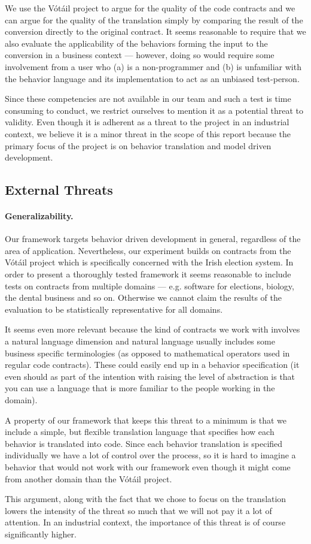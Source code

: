 We use the V\'{o}t\'{a}il project to argue for the quality of the code contracts and we can argue for the quality of the translation simply by comparing the result of the conversion directly to the original contract.
It seems reasonable to require that we also evaluate the applicability of the behaviors forming the input to the conversion in a business context --- however, doing so would require some involvement from a user who (a) is a non-programmer and (b) is unfamiliar with the behavior language and its implementation to act as an unbiased test-person.

Since these competencies are not available in our team and such a test is time consuming to conduct, we restrict ourselves to mention it as a potential threat to validity.
Even though it is adherent as a threat to the project in an industrial context, we believe it is a minor threat in the scope of this report because the primary focus of the project is on behavior translation and model driven development.

\subsection{External Threats}
\paragraph{Generalizability.}
Our framework targets behavior driven development in general, regardless of the area of application.
Nevertheless, our experiment builds on contracts from the V\'{o}t\'{a}il project which is specifically concerned with the Irish election system.
In order to present a thoroughly tested framework it seems reasonable to include tests on contracts from multiple domains --- e.g. software for elections, biology, the dental business and so on.
Otherwise we cannot claim the results of the evaluation to be statistically representative for all domains.
 
It seems even more relevant because the kind of contracts we work with involves a natural language dimension and natural language usually includes some business specific terminologies (as opposed to mathematical operators used in regular code contracts).
These could easily end up in a behavior specification (it even should as part of the intention with raising the level of abstraction is that you can use a language that is more familiar to the people working in the domain).
 
A property of our framework that keeps this threat to a minimum is that we include a simple, but flexible translation language that specifies how each behavior is translated into code.
Since each behavior translation is specified individually we have a lot of control over the process, so it is hard to imagine a behavior that would not work with our framework even though it might come from another domain than the V\'{o}t\'{a}il project.
 
This argument, along with the fact that we chose to focus on the translation lowers the intensity of the threat so much that we will not pay it a lot of attention.
In an industrial context, the importance of this threat is of course significantly higher.